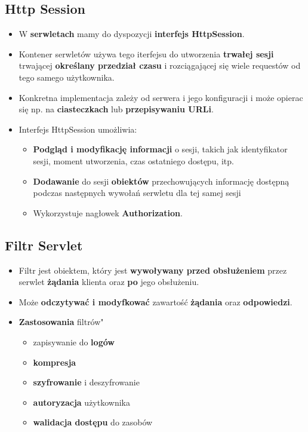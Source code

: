 \documentclass[../main.tex]{subfiles}
\begin{document}
    \subsection{Http Session}
    \begin{itemize}
        \item W \textbf{serwletach} mamy do dyspozycji \textbf{interfejs HttpSession}.
        \item Kontener serwletów używa tego iterfejsu do utworzenia \textbf{trwałej sesji} trwającej \textbf{określany przedział czasu} i rozciągającej się wiele requestów od tego samego użytkownika.
        \item Konkretna implementacja zależy od serwera i jego konfiguracji i może opierac się np. na \textbf{ciasteczkach} lub \textbf{przepisywaniu URLi}.
        \item Interfejs HttpSession umożliwia:
        \begin{itemize}
            \item \textbf{Podgląd i modyfikację informacji} o sesji, takich jak identyfikator sesji, moment utworzenia, czas ostatniego dostępu, itp.
            \item \textbf{Dodawanie} do sesji \textbf{obiektów} przechowujących informację dostępną
            podczas następnych wywołań serwletu dla tej samej sesji
            \item Wykorzystuje nagłowek \textbf{Authorization}.
        \end{itemize}
    \end{itemize}



    \subsection{Filtr Servlet}
    \begin{itemize}
        \item Filtr jest obiektem, który jest \textbf{wywoływany przed obsłużeniem} przez serwlet \textbf{żądania} klienta oraz \textbf{po} jego obsłużeniu.
        \item Może \textbf{odczytywać i modyfkować} zawartość \textbf{żądania} oraz \textbf{odpowiedzi}.
        \item \textbf{Zastosowania} filtrów"
        \begin{itemize}
            \item zapisywanie do \textbf{logów}
            \item \textbf{kompresja}
            \item \textbf{szyfrowanie} i deszyfrowanie
            \item \textbf{autoryzacja} użytkownika
            \item \textbf{walidacja dostępu} do zasobów
        \end{itemize}
    \end{itemize}
\end{document}
